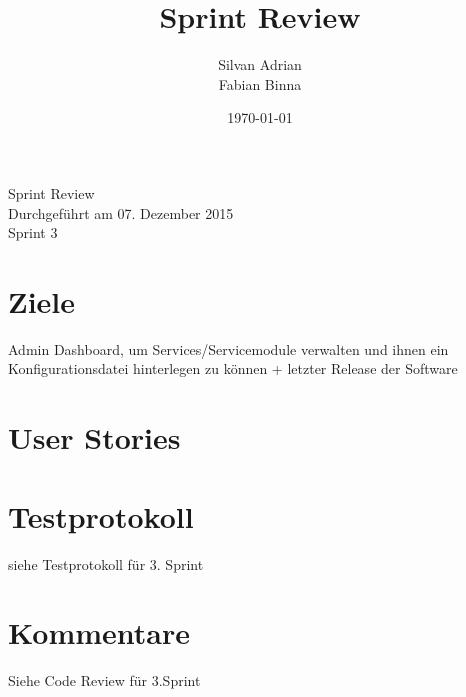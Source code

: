 \documentclass[11pt]{scrartcl}
\title{Sprint Review}
\author{Silvan Adrian \\ Fabian Binna}
\date{\today{}}
\begin{document}
\def\arraystretch{1.5}
\begin{titlepage}
\begin{center}
\vspace{10em}

\vspace{10em}
\end{center}
\begin{center}
\huge {Sprint Review}\\

Durchgeführt am 07. Dezember 2015\\
Sprint 3
\end{center}

\end{titlepage}

\newpage
\tableofcontents
\newpage

\section{Ziele}
Admin Dashboard, um Services/Servicemodule 
verwalten und ihnen ein Konfigurationsdatei hinterlegen zu können +
 letzter Release der Software

\section{User Stories}





\newpage

\section{Testprotokoll}

siehe Testprotokoll für 3. Sprint

\section{Kommentare}

Siehe Code Review für 3.Sprint
\end{document}

